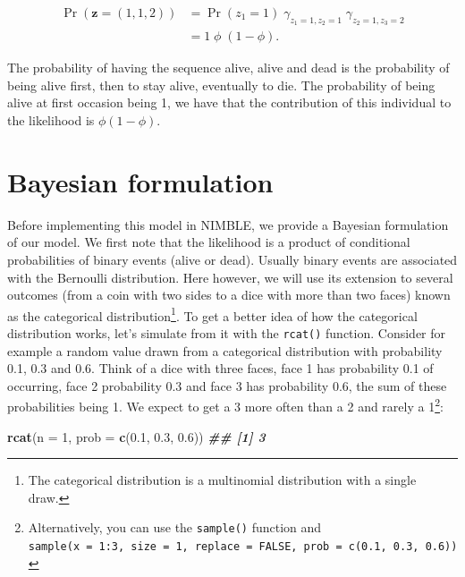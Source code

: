 \documentclass[
  12pt,
]{krantz}
\newenvironment{Shaded}{\begin{snugshade}}{\end{snugshade}}
\newcommand{\AttributeTok}[1]{\textcolor[rgb]{0.13,0.29,0.53}{#1}}
\newcommand{\DecValTok}[1]{\textcolor[rgb]{0.00,0.00,0.81}{#1}}
\newcommand{\DocumentationTok}[1]{\textcolor[rgb]{0.56,0.35,0.01}{\textbf{\textit{#1}}}}
\newcommand{\FloatTok}[1]{\textcolor[rgb]{0.00,0.00,0.81}{#1}}
\newcommand{\FunctionTok}[1]{\textcolor[rgb]{0.13,0.29,0.53}{\textbf{#1}}}
\newcommand{\NormalTok}[1]{#1}
\begin{document}
\begin{align*}
\Pr(\mathbf{z} = (1, 1, 2)) &= \Pr(z_1 = 1) \; \gamma_{z_{1} = 1, z_{2} = 1} \; \gamma_{z_{2} = 1, z_{3} = 2}\\
                            &= 1 \; \phi \; (1 - \phi).
\end{align*}

The probability of having the sequence alive, alive and dead is the probability of being alive first, then to stay alive, eventually to die. The probability of being alive at first occasion being 1, we have that the contribution of this individual to the likelihood is \(\phi (1 - \phi)\).

\hypertarget{bayesian-formulation}{%
\section{Bayesian formulation}\label{bayesian-formulation}}

Before implementing this model in NIMBLE, we provide a Bayesian formulation of our model. We first note that the likelihood is a product of conditional probabilities of binary events (alive or dead). Usually binary events are associated with the Bernoulli distribution. Here however, we will use its extension to several outcomes (from a coin with two sides to a dice with more than two faces) known as the categorical distribution\footnote{The categorical distribution is a multinomial distribution with a single draw.}. To get a better idea of how the categorical distribution works, let's simulate from it with the \texttt{rcat()} function. Consider for example a random value drawn from a categorical distribution with probability 0.1, 0.3 and 0.6. Think of a dice with three faces, face 1 has probability 0.1 of occurring, face 2 probability 0.3 and face 3 has probability 0.6, the sum of these probabilities being 1. We expect to get a 3 more often than a 2 and rarely a 1\footnote{Alternatively, you can use the \texttt{sample()} function and \texttt{sample(x\ =\ 1:3,\ size\ =\ 1,\ replace\ =\ FALSE,\ prob\ =\ c(0.1,\ 0.3,\ 0.6))}}:

\begin{Shaded}
\begin{Highlighting}[]
\FunctionTok{rcat}\NormalTok{(}\AttributeTok{n =} \DecValTok{1}\NormalTok{, }\AttributeTok{prob =} \FunctionTok{c}\NormalTok{(}\FloatTok{0.1}\NormalTok{, }\FloatTok{0.3}\NormalTok{, }\FloatTok{0.6}\NormalTok{))}
\DocumentationTok{\#\# [1] 3}
\end{Highlighting}
\end{Shaded}
\end{document}
